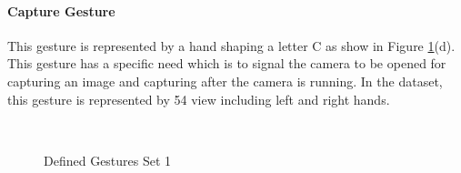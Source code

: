 \paragraph{Capture Gesture}
This gesture is represented by a hand shaping a letter C as show in Figure \ref{fig:set1}(d). This gesture has a specific need which is to signal the camera to be opened for capturing an image and capturing after the camera is running. In the dataset, this gesture is represented by 54 view including left and right hands. 

\begin{figure}[h]
\begin{dBox}
\centering
  \mbox{
   }
   \caption{Defined Gestures Set 1 \label{fig:set1} }   
\end{dBox}   
\end{figure}

